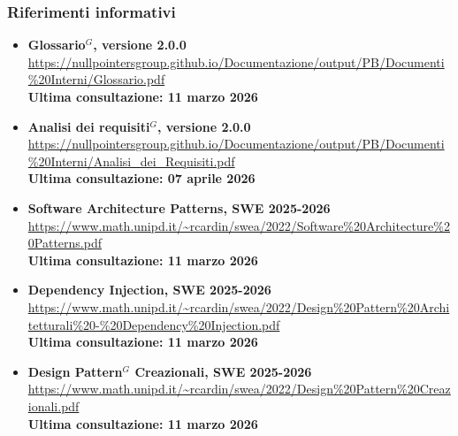 \subsubsection{Riferimenti informativi}
\begin{itemize}[itemsep=5pt, parsep=5pt, label=$\scriptstyle\bullet$]

	\item \textbf{Glossario$^G$, versione 2.0.0}\\
	 \url{https://nullpointersgroup.github.io/Documentazione/output/PB/Documenti%20Interni/Glossario.pdf}\\[3pt]
	\textbf{Ultima consultazione: 11 marzo 2026}
	
	\item \textbf{Analisi dei requisiti$^G$, versione 2.0.0}\\
	 \url{https://nullpointersgroup.github.io/Documentazione/output/PB/Documenti%20Interni/Analisi_dei_Requisiti.pdf}\\[3pt]
	\textbf{Ultima consultazione: 07 aprile 2026}
	
	\item \textbf{Software Architecture Patterns, SWE 2025-2026}\\
	 \url{https://www.math.unipd.it/~rcardin/swea/2022/Software%20Architecture%20Patterns.pdf}\\[3pt]
	\textbf{Ultima consultazione: 11 marzo 2026}
	
	\item \textbf{Dependency Injection, SWE 2025-2026}\\
	 \url{https://www.math.unipd.it/~rcardin/swea/2022/Design%20Pattern%20Architetturali%20-%20Dependency%20Injection.pdf}\\[3pt]
	\textbf{Ultima consultazione: 11 marzo 2026}
	
	\item \textbf{Design Pattern$^G$ Creazionali, SWE 2025-2026}\\
	 \url{https://www.math.unipd.it/~rcardin/swea/2022/Design%20Pattern%20Creazionali.pdf}\\[3pt]
	\textbf{Ultima consultazione: 11 marzo 2026}

\end{itemize}